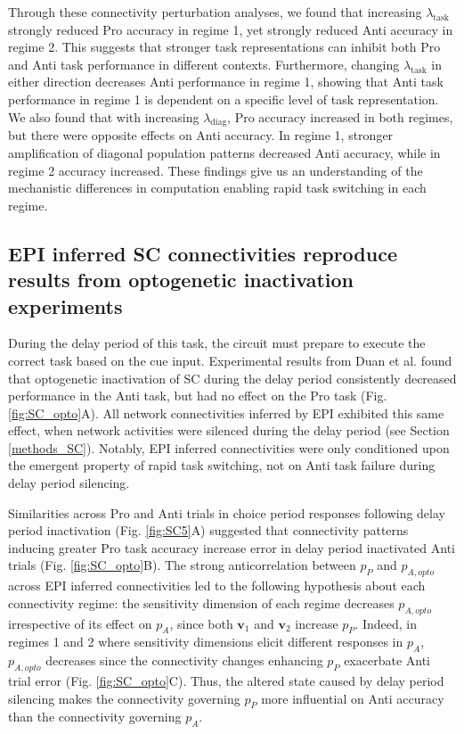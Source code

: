 \documentclass[11pt]{article}
\begin{document}
Through these connectivity perturbation analyses, we found that increasing $\lambda_{\text{task}}$ strongly reduced Pro accuracy in regime 1, yet strongly reduced Anti accuracy in regime 2.
This suggests that stronger task representations can inhibit both Pro and Anti task performance in different contexts.
Furthermore, changing $\lambda_{\text{task}}$ in either direction decreases Anti performance in regime 1, showing that Anti task performance in regime 1 is dependent on a specific level of task representation.
We also found that with increasing $\lambda_{\text{diag}}$, Pro accuracy increased in both regimes, but there were opposite effects on Anti accuracy.
In regime 1, stronger amplification of diagonal population patterns decreased Anti accuracy, while in regime 2 accuracy increased.
These findings give us an understanding of the mechanistic differences in computation enabling rapid task switching in each regime.

\subsection{EPI inferred SC connectivities reproduce results from optogenetic inactivation experiments} \label{results_SC_opt}

During the delay period of this task, the circuit must prepare to execute the correct task based on the cue input.
Experimental results from Duan et al. found that optogenetic inactivation of SC during the delay period consistently decreased performance in the Anti task, but had no effect on the Pro task (Fig. \ref{fig:SC_opto}A).
All network connectivities inferred by EPI exhibited this same effect, when network activities were silenced during the delay period (see Section \ref{methods_SC}).
Notably, EPI inferred connectivities were only conditioned upon the emergent property of rapid task switching, not on Anti task failure during delay period silencing.

Similarities across Pro and Anti trials in choice period responses following delay period inactivation (Fig. \ref{fig:SC5}A) suggested that connectivity patterns inducing greater Pro task accuracy increase error in delay period inactivated Anti trials (Fig. \ref{fig:SC_opto}B).
The strong anticorrelation between $p_P$ and $p_{A, opto}$ across EPI inferred connectivities led to the following hypothesis about each connectivity regime: the sensitivity dimension of each regime decreases $p_{A,opto}$ irrespective of its effect on $p_A$, since both $\mathbf{v}_1$ and $\mathbf{v}_2$ increase $p_P$.
Indeed, in regimes 1 and 2 where sensitivity dimensions elicit different responses in $p_A$, $p_{A,opto}$ decreases since the connectivity changes enhancing $p_P$ exacerbate Anti trial error (Fig. \ref{fig:SC_opto}C).
Thus, the altered state caused by delay period silencing makes the connectivity governing $p_P$ more influential on Anti accuracy than the connectivity governing $p_A$.
\end{document}
